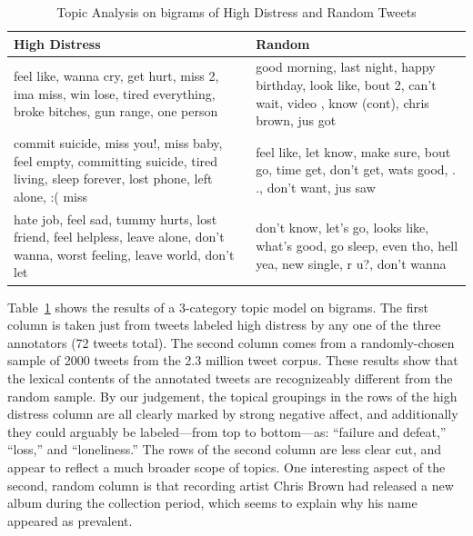 \documentclass[11pt]{article}
\begin{document}
\begin{table}[h]
\footnotesize
\centering
\begin{tabular}{|>{\centering\arraybackslash}m{1.4in}| >{\centering\arraybackslash}m{1.2in}|}
\hline
High Distress & Random \\ \hline
feel like, wanna cry, get hurt, miss 2, ima miss, win lose, tired everything, broke bitches, gun range, one person & good morning, last night, happy birthday, look like, bout 2, can't wait, video , know (cont), chris brown, jus got \\ \hline
commit suicide, miss you!, miss baby, feel empty, committing suicide, tired living, sleep forever, lost phone, left alone, :( miss & feel like, let know, make sure, bout go, time get, don't get, wats good, . ., don't want, jus saw \\ \hline
hate job, feel sad, tummy hurts, lost friend, feel helpless, leave alone, don't wanna, worst feeling, leave world, don't let & don't know, let's go, looks like, what's good, go sleep, even tho, hell yea, new single, r u?, don't wanna \\ \hline
\end{tabular}
\caption{Topic Analysis on bigrams of High Distress and Random Tweets }
\label{tab:tm}
\end{table}

Table~\ref{tab:tm} shows the results of a 3-category topic model on bigrams.  The first column is taken just from tweets labeled high distress by any one of the three annotators (72 tweets total). The second column comes from a randomly-chosen sample of 2000 tweets from the 2.3 million tweet corpus. These results show that the lexical contents of the annotated tweets are recognizeably different from the random sample. By our judgement, the topical groupings in the rows of the high distress column are all clearly marked by strong negative affect, and additionally they could arguably be labeled---from top to bottom---as: ``failure and defeat,'' ``loss,'' and ``loneliness.''  The rows of the second column are less clear cut, and appear to reflect a much broader scope of topics. One interesting aspect of the second, random column is that recording artist Chris Brown had released a new album during the collection period, which seems to explain why his name appeared as prevalent.
\end{document}
